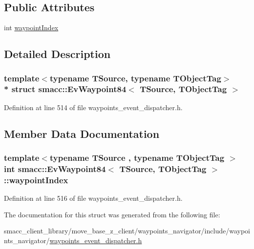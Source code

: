 \subsection*{Public Attributes}
\begin{DoxyCompactItemize}
\item 
int \hyperlink{structsmacc_1_1EvWaypoint84_a736420f6279533bb45ce208c35c4be07}{waypoint\+Index}
\end{DoxyCompactItemize}


\subsection{Detailed Description}
\subsubsection*{template$<$typename T\+Source, typename T\+Object\+Tag$>$\\*
struct smacc\+::\+Ev\+Waypoint84$<$ T\+Source, T\+Object\+Tag $>$}



Definition at line 514 of file waypoints\+\_\+event\+\_\+dispatcher.\+h.



\subsection{Member Data Documentation}
\subsubsection[{\texorpdfstring{waypoint\+Index}{waypointIndex}}]{\setlength{\rightskip}{0pt plus 5cm}template$<$typename T\+Source , typename T\+Object\+Tag $>$ int {\bf smacc\+::\+Ev\+Waypoint84}$<$ T\+Source, T\+Object\+Tag $>$\+::waypoint\+Index}\hypertarget{structsmacc_1_1EvWaypoint84_a736420f6279533bb45ce208c35c4be07}{}\label{structsmacc_1_1EvWaypoint84_a736420f6279533bb45ce208c35c4be07}


Definition at line 516 of file waypoints\+\_\+event\+\_\+dispatcher.\+h.



The documentation for this struct was generated from the following file\+:\begin{DoxyCompactItemize}
\item 
smacc\+\_\+client\+\_\+library/move\+\_\+base\+\_\+z\+\_\+client/waypoints\+\_\+navigator/include/waypoints\+\_\+navigator/\hyperlink{waypoints__event__dispatcher_8h}{waypoints\+\_\+event\+\_\+dispatcher.\+h}\end{DoxyCompactItemize}
